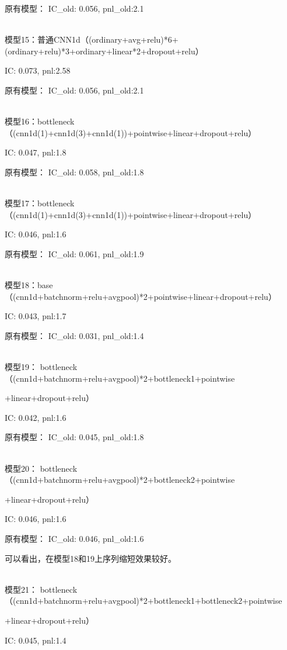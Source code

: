 \documentclass[11pt]{ctexart}
\begin{document}
原有模型：
{\kaishu \small IC\_old: 0.056, pnl\_old:2.1}

~\\
模型15：普通CNN1d（(ordinary+avg+relu)*6+(ordinary+relu)*3+ordinary+linear*2+dropout+relu）

{\kaishu \small IC: 0.073, pnl:2.58}

原有模型：
{\kaishu \small IC\_old: 0.056, pnl\_old:2.1}

~\\
模型16：bottleneck（(cnn1d(1)+cnn1d(3)+cnn1d(1))+pointwise+linear+dropout+relu）

{\kaishu \small IC: 0.047, pnl:1.8}

原有模型：
{\kaishu \small IC\_old: 0.058, pnl\_old:1.8}

~\\
模型17：bottleneck（(cnn1d(1)+cnn1d(3)+cnn1d(1))+pointwise+linear+dropout+relu）


{\kaishu \small IC: 0.046, pnl:1.6}

原有模型：
{\kaishu \small IC\_old: 0.061, pnl\_old:1.9}

~\\
模型18：base（(cnn1d+batchnorm+relu+avgpool)*2+pointwise+linear+dropout+relu）

{\kaishu \small IC: 0.043, pnl:1.7}

原有模型：
{\kaishu \small IC\_old: 0.031, pnl\_old:1.4}

~\\
模型19： bottleneck（(cnn1d+batchnorm+relu+avgpool)*2+bottleneck1+pointwise

+linear+dropout+relu）

{\kaishu \small IC: 0.042, pnl:1.6}

原有模型：
{\kaishu \small IC\_old: 0.045, pnl\_old:1.8}

~\\
模型20： bottleneck（(cnn1d+batchnorm+relu+avgpool)*2+bottleneck2+pointwise

+linear+dropout+relu）

{\kaishu \small IC: 0.046, pnl:1.6}

原有模型：
{\kaishu \small IC\_old: 0.046, pnl\_old:1.6}

可以看出，在模型18和19上序列缩短效果较好。

~\\
模型21： bottleneck（(cnn1d+batchnorm+relu+avgpool)*2+bottleneck1+bottleneck2+pointwise

+linear+dropout+relu）

{\kaishu \small IC: 0.045, pnl:1.4}
\end{document}
